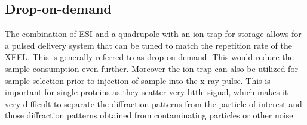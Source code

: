 \subsection{Drop-on-demand}
The combination of ESI and a quadrupole with an ion trap for storage allows for a pulsed delivery system that can be tuned to match the repetition rate of the XFEL. This is generally referred to as drop-on-demand. This would reduce the sample consumption even further. Moreover the ion trap can also be utilized for sample selection prior to injection of sample into the x-ray pulse. This is important for single proteins as they scatter very little signal, which makes it very difficult to separate the diffraction patterns from the particle-of-interest and those diffraction patterns obtained from contaminating particles or other noise. 


